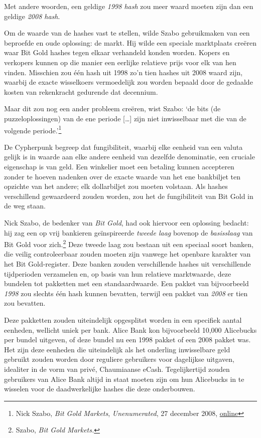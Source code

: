 \documentclass[
  a5paper,
  smalldemyvopaper,11pt,twoside,onecolumn,openright,extrafontsizes,
hidelinks]{memoir}
\begin{document}
Met andere woorden, een geldige \emph{1998 hash} zou meer waard moeten
zijn dan een geldige \emph{2008 hash}.

Om de waarde van de hashes vast te stellen, wilde Szabo gebruikmaken van
een beproefde en oude oplossing: de markt. Hij wilde een speciale
marktplaats creëren waar Bit Gold hashes tegen elkaar verhandeld konden
worden. Kopers en verkopers kunnen op die manier een eerlijke relatieve
prijs voor elk van hen vinden. Misschien zou één hash uit 1998 zo'n tien
hashes uit 2008 waard zijn, waarbij de exacte wisselkoers vermoedelijk
zou worden bepaald door de gedaalde kosten van rekenkracht gedurende dat
decennium.

Maar dit zou nog een ander probleem creëren, wist Szabo: `de bits (de
puzzeloplossingen) van de ene periode {[}\ldots{]} zijn niet
inwisselbaar met die van de volgende periode.'\footnote{Nick Szabo,
  \emph{Bit Gold Markets}, \emph{Unenumerated}, 27 december 2008,
  \href{https://unenumerated.blogspot.com/2008/04/bit-gold-markets.html}{online}}

De Cypherpunk begreep dat fungibiliteit, waarbij elke eenheid van een
valuta gelijk is in waarde aan elke andere eenheid van dezelfde
denominatie, een cruciale eigenschap is van geld. Een winkelier moet een
betaling kunnen accepteren zonder te hoeven nadenken over de exacte
waarde van het ene bankbiljet ten opzichte van het andere; elk
dollarbiljet zou moeten volstaan. Als hashes verschillend gewaardeerd
zouden worden, zou het de fungibiliteit van Bit Gold in de weg staan.

Nick Szabo, de bedenker van \emph{Bit Gold}, had ook hiervoor een
oplossing bedacht: hij zag een op vrij bankieren geïnspireerde
\emph{tweede laag} bovenop de \emph{basisslaag} van Bit Gold voor
zich.\footnote{Szabo, \emph{Bit Gold Markets.}} Deze tweede laag zou
bestaan uit een speciaal soort banken, die veilig controleerbaar zouden
moeten zijn vanwege het openbare karakter van het Bit Gold-register.
Deze banken zouden verschillende hashes uit verschillende tijdperioden
verzamelen en, op basis van hun relatieve marktwaarde, deze bundelen tot
pakketten met een standaardwaarde. Een pakket van bijvoorbeeld
\emph{1998} zou slechts één hash kunnen bevatten, terwijl een pakket van
\emph{2008} er tien zou bevatten.

Deze pakketten zouden uiteindelijk opgesplitst worden in een specifiek
aantal eenheden, wellicht uniek per bank. Alice Bank kon bijvoorbeeld
10,000 Alicebucks per bundel uitgeven, of deze bundel nu een 1998 pakket
of een 2008 pakket was. Het zijn deze eenheden die uiteindelijk als het
onderling inwisselbare geld gebruikt zouden worden door reguliere
gebruikers voor dagelijkse uitgaven, idealiter in de vorm van privé,
Chaumiaanse eCash. Tegelijkertijd zouden gebruikers van Alice Bank
altijd in staat moeten zijn om hun Alicebucks in te wisselen voor de
daadwerkelijke hashes die deze onderbouwen.
\end{document}
